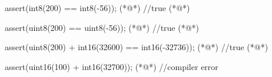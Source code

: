 \begin{soliditybox}
assert(int8(200) == int8(-56)); (*@\pause@*) //true (*@\pause@*)

assert(uint8(200) == uint8(-56)); (*@\pause@*) //true (*@\pause@*)

assert(uint8(200) + int16(32600) == int16(-32736)); (*@\pause@*) //true (*@\pause@*)

assert(uint16(100) + int16(32700)); (*@\pause@*) //compiler error
\end{soliditybox}